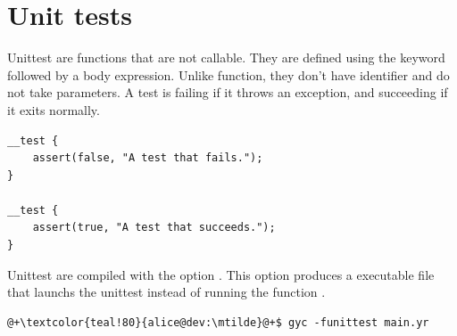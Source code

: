 \section{Unit tests}%
\label{sec:unit_test}

Unittest are functions that are not callable. They are defined using the keyword
 followed by a body expression. Unlike function, they don't
have identifier and do not take parameters. A test is failing if it throws an
exception, and succeeding if it exits normally.

\begin{lstlisting}[style=coloredverbatim]
__test {
    assert(false, "A test that fails.");
}

__test {
    assert(true, "A test that succeeds.");
}
\end{lstlisting}


Unittest are compiled with the option . This option produces
a executable file that launchs the unittest instead of running the function
.

\begin{lstlisting}[style=bashVerb, escapechar=@+]
@+\textcolor{teal!80}{alice@dev:\mtilde}@+$ gyc -funittest main.yr
\end{lstlisting}

\vfill%
\pagebreak
